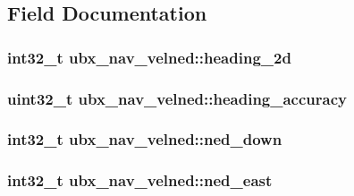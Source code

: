\subsection{Field Documentation}
\hypertarget{structubx__nav__velned_a0c7bc357ef18376836a95b06c248810a}{
\subsubsection[{heading\+\_\+2d}]{\setlength{\rightskip}{0pt plus 5cm}int32\+\_\+t ubx\+\_\+nav\+\_\+velned\+::heading\+\_\+2d}}\label{structubx__nav__velned_a0c7bc357ef18376836a95b06c248810a}
\hypertarget{structubx__nav__velned_abf6877fc3ba435d7d3369c2a6c40ee7f}{
\subsubsection[{heading\+\_\+accuracy}]{\setlength{\rightskip}{0pt plus 5cm}uint32\+\_\+t ubx\+\_\+nav\+\_\+velned\+::heading\+\_\+accuracy}}\label{structubx__nav__velned_abf6877fc3ba435d7d3369c2a6c40ee7f}
\hypertarget{structubx__nav__velned_a17af731dd9b12e1b7beb733f4aae981c}{
\subsubsection[{ned\+\_\+down}]{\setlength{\rightskip}{0pt plus 5cm}int32\+\_\+t ubx\+\_\+nav\+\_\+velned\+::ned\+\_\+down}}\label{structubx__nav__velned_a17af731dd9b12e1b7beb733f4aae981c}
\hypertarget{structubx__nav__velned_aa50d2e8676473ad0fa5383ab9c839b8d}{
\subsubsection[{ned\+\_\+east}]{\setlength{\rightskip}{0pt plus 5cm}int32\+\_\+t ubx\+\_\+nav\+\_\+velned\+::ned\+\_\+east}}\label{structubx__nav__velned_aa50d2e8676473ad0fa5383ab9c839b8d}
